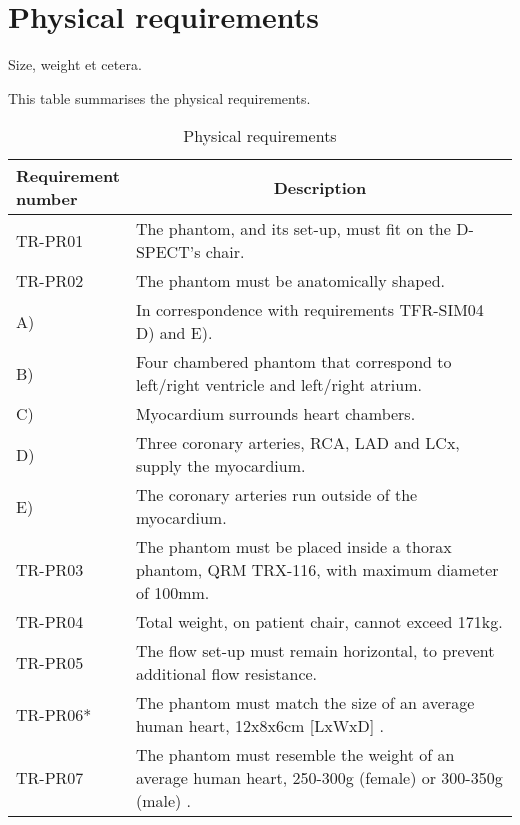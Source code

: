 \section{Physical requirements}
Size, weight et cetera.
\begin{table} [H]
\caption{Physical requirements}
\label{tab:physrec}
This table summarises the physical requirements.
\begin{tabular}{l|p{120mm}|}
	\makecell[l]{\textbf{Requirement} \\ \textbf{number}} & \multicolumn{1}{c}{\textbf{Description}}\\
	\hline
	TR-PR01 & The phantom, and its set-up, must fit on the D-SPECT's chair. \\
	TR-PR02 & The phantom must be anatomically shaped. \\
	\hspace{1.5cm} A) & In correspondence with requirements TFR-SIM04 D) and E). \\
	\hspace{1.5cm} B) & Four chambered phantom that correspond to left/right ventricle and left/right atrium. \\
	\hspace{1.5cm} C) & Myocardium surrounds heart chambers. \\
	\hspace{1.5cm} D) & Three coronary arteries, RCA, LAD and LCx, supply the myocardium. \\
	\hspace{1.5cm} E) & The coronary arteries run outside of the myocardium. \\
	TR-PR03 & The phantom must be placed inside a thorax phantom, QRM TRX-116, with maximum diameter of 100mm. \\
	TR-PR04 & Total weight, on patient chair, cannot exceed 171kg. \\
	TR-PR05 & The flow set-up must remain horizontal, to prevent additional flow resistance. \\
	TR-PR06* & The phantom must match the size of an average human heart, 12x8x6cm [LxWxD] \citep{openstax2013anatomy}. \\
	TR-PR07 & The phantom must resemble the weight of an average human heart, 250-300g (female) or 300-350g (male) \citep{openstax2013anatomy}. \\

\end{tabular}
\end{table}

